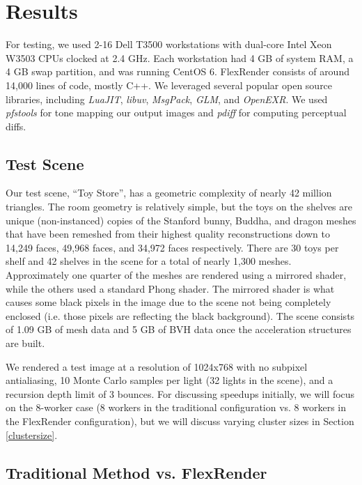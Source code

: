 \documentclass[a4paper,twoside]{article}
\begin{document}
\section{Results}
\label{results}

For testing, we used 2-16 Dell T3500 workstations with dual-core Intel Xeon
W3503 CPUs clocked at 2.4 GHz. Each workstation had 4 GB of system RAM, a 4 GB
swap partition, and was running CentOS 6. FlexRender consists of around 14,000
lines of code, mostly C++. We leveraged several popular open source libraries,
including \emph{LuaJIT}, \emph{libuv}, \emph{MsgPack}, \emph{GLM}, and
\emph{OpenEXR}. We used \emph{pfstools} for tone mapping our output images and
\emph{pdiff} for computing perceptual diffs.

\subsection{Test Scene}
\label{toystore}

Our test scene, ``Toy Store'', has a geometric complexity of nearly 42 million
triangles. The room geometry is relatively simple, but the toys on the shelves
are unique (non-instanced) copies of the Stanford bunny, Buddha, and dragon
meshes that have been remeshed from their highest quality reconstructions down
to 14,249 faces, 49,968 faces, and 34,972 faces respectively. There are 30 toys
per shelf and 42 shelves in the scene for a total of nearly 1,300 meshes.
Approximately one quarter of the meshes are rendered using a mirrored shader,
while the others used a standard Phong shader. The mirrored shader is what causes
some black pixels in the image due to the scene not being completely enclosed (i.e. those
pixels are reflecting the black background).
The scene consists of 1.09 GB of
mesh data and 5 GB of BVH data once the acceleration structures are built.

We rendered a test image at a resolution of 1024x768 with no subpixel
antialiasing, 10 Monte Carlo samples per light (32 lights in the scene), and a
recursion depth limit of 3 bounces. For discussing speedups initially, we will
focus on the 8-worker case (8 workers in the traditional configuration vs. 8
workers in the FlexRender configuration), but we will discuss varying cluster
sizes in Section \ref{clustersize}.

\subsection{Traditional Method vs. FlexRender}
\end{document}
